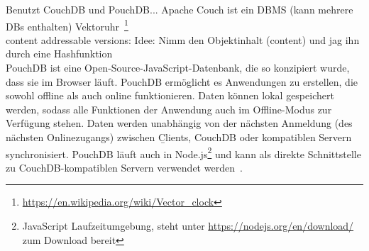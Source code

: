 Benutzt CouchDB und PouchDB...\cite{hoodie}
%
%
Apache Couch\tm
ist ein \gls{DBMS} (kann mehrere \glspl{DB} enthalten)
Vektoruhr~\footnote{\url{https://en.wikipedia.org/wiki/Vector_clock}} \\
content addressable versions: Idee: Nimm den Objektinhalt (content) und jag ihn durch eine \gls{Hashfunktion}\\
%
%
PouchDB ist eine Open-Source-JavaScript-Datenbank, die so konzipiert wurde, dass sie im Browser läuft. PouchDB ermöglicht es Anwendungen zu erstellen, die sowohl offline als auch online funktionieren. Daten können lokal gespeichert werden, sodass alle Funktionen der Anwendung auch im Offline-Modus zur Verfügung stehen.
Daten werden unabhängig von der nächsten Anmeldung (des nächsten Onlinezugangs) zwischen \b{Clients}, CouchDB oder kompatiblen Servern synchronisiert.
PouchDB läuft auch in Node.js\footnote{JavaScript Laufzeitumgebung, steht unter \url{https://nodejs.org/en/download/} zum Download bereit} und kann als direkte Schnittstelle zu CouchDB-kompatiblen Servern verwendet werden~\cite{pouch}.
